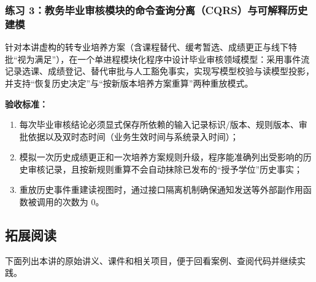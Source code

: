 \documentclass[UTF8,a4paper,11pt,fontset=fandol]{ctexart}
\begin{document}
\subsubsection*{练习 3：教务毕业审核模块的命令查询分离（CQRS）与可解释历史建模}

针对本讲虚构的转专业培养方案（含课程替代、缓考暂选、成绩更正与线下特批“视为满足”），在一个单进程模块化程序中设计毕业审核领域模型：采用事件流记录选课、成绩登记、替代审批与人工豁免事实，实现写模型校验与读模型投影，并支持“恢复历史决定”与“按新版本培养方案重算”两种重放模式。

\par{}\textbf{验收标准：}

\begin{enumerate}
\item 每次毕业审核结论必须显式保存所依赖的输入记录标识/版本、规则版本、审批依据以及双时态时间（业务生效时间与系统录入时间）；

\item 模拟一次历史成绩更正和一次培养方案规则升级，程序能准确列出受影响的历史审核记录，且按新规则重算不会自动抹除已发布的“授予学位”历史事实；

\item 重放历史事件重建读视图时，通过接口隔离机制确保通知发送等外部副作用函数被调用的次数为 0。
\end{enumerate}

\subsection{拓展阅读}

下面列出本讲的原始讲义、课件和相关项目，便于回看案例、查阅代码并继续实践。
\end{document}
